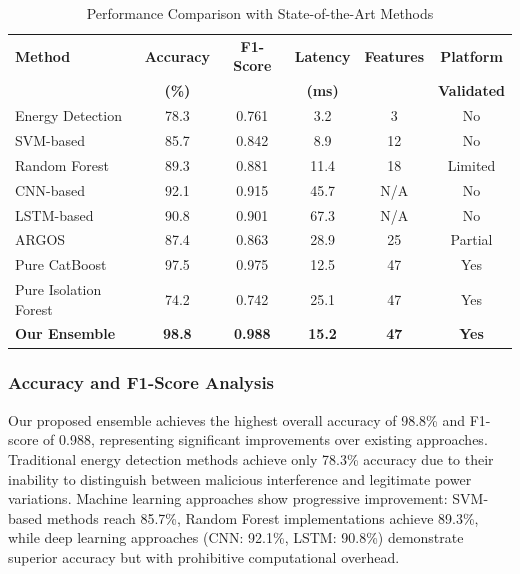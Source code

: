 \documentclass[journal]{IEEEtran}
\begin{document}
\begin{table}[t]
    \centering
    \caption{Performance Comparison with State-of-the-Art Methods}
    \label{tab:comparison}
    \renewcommand{\arraystretch}{1.2}
    \setlength{\tabcolsep}{8pt}
    \begin{tabular}{|l|c|c|c|c|c|}
        \hline
        \textbf{Method} & \textbf{Accuracy} & \textbf{F1-Score} & \textbf{Latency} & \textbf{Features} & \textbf{Platform} \\
        \textbf{} & \textbf{(\%)} & & \textbf{(ms)} & & \textbf{Validated} \\
        \hline
        Energy Detection~\cite{mahmood2021} & 78.3 & 0.761 & 3.2 & 3 & No \\
        SVM-based~\cite{liu2018} & 85.7 & 0.842 & 8.9 & 12 & No \\
        Random Forest~\cite{zhang2020} & 89.3 & 0.881 & 11.4 & 18 & Limited \\
        CNN-based~\cite{wang2021} & 92.1 & 0.915 & 45.7 & N/A & No \\
        LSTM-based~\cite{kim2022} & 90.8 & 0.901 & 67.3 & N/A & No \\
        ARGOS~\cite{dimou2025} & 87.4 & 0.863 & 28.9 & 25 & Partial \\
        Pure CatBoost & 97.5 & 0.975 & 12.5 & 47 & Yes \\
        Pure Isolation Forest & 74.2 & 0.742 & 25.1 & 47 & Yes \\
        \textbf{Our Ensemble} & \textbf{98.8} & \textbf{0.988} & \textbf{15.2} & \textbf{47} & \textbf{Yes} \\
        \hline
    \end{tabular}
\end{table}

\subsubsection{Accuracy and F1-Score Analysis}

Our proposed ensemble achieves the highest overall accuracy of 98.8\% and F1-score of 0.988, representing significant improvements over existing approaches. Traditional energy detection methods achieve only 78.3\% accuracy due to their inability to distinguish between malicious interference and legitimate power variations. Machine learning approaches show progressive improvement: SVM-based methods reach 85.7\%, Random Forest implementations achieve 89.3\%, while deep learning approaches (CNN: 92.1\%, LSTM: 90.8\%) demonstrate superior accuracy but with prohibitive computational overhead.
\end{document}
